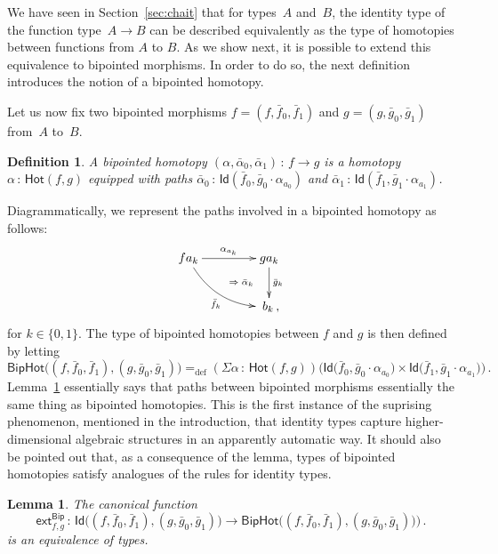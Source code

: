 \documentclass[10pt,a4paper,oneside,reqno]{amsart}
\numberwithin{equation}{section}
\theoremstyle{mythm}
\newtheorem{lemma}[theorem]{Lemma}
\theoremstyle{mydef}
\newtheorem{definition}[theorem]{Definition}
\theoremstyle{myrmk}
\newcommand{\defeq}{=_{\mathrm{def}}}
\newcommand{\co}{\,{:}\,}
\newcommand{\ct}{\cdot}
\newcommand{\Hot}{\mathsf{Hot}}
\newcommand{\ext}{\mathsf{ext}}
\newcommand{\Id}{\mathsf{Id}}
\newcommand{\Bip}{\mathsf{Bip}}
\newcommand{\BipHot}{\mathsf{BipHot}}
\begin{document}
We have seen in Section~\ref{sec:chait} that for types~$A$ and~$B$, the identity type of the function
 type~$A \to B$ can be described equivalently as the type of homotopies between functions from $A$ to $B$. As
we show next, it is possible to extend this equivalence to bipointed morphisms. In order to do so, the next definition  introduces the notion of a bipointed homotopy. 


\medskip

Let us now fix two bipointed morphisms $f = (f, \bar{f}_0, \bar{f}_1)$ and $g = (g, \bar{g}_0, \bar{g}_1)$ from~$A$
to~$B$.


\begin{definition} \label{thm:biphomotopy} A \emph{bipointed homotopy} 
$(\alpha, \bar{\alpha}_0, \bar{\alpha}_1) \co f \to  g$
is a homotopy~$\alpha \co  \Hot(f, g)$ equipped with paths
$\bar{\alpha}_0 \co \Id(  \bar{f}_0 ,  \bar{g}_0 \ct \alpha_{a_0}  )$ and $\bar{\alpha}_1 \co \Id(
\bar{f}_1 , \bar{g}_1 \ct  \alpha_{a_1})$. 
\end{definition}

Diagrammatically, we represent the paths  involved in a bipointed homotopy as follows:
\[
\xymatrix@C=1.5cm{
f a_k  \ar[r]^{\alpha_{a_k}}  \ar@/_1pc/[dr]_{\bar{f}_k}  
\ar@{}[dr]|{\qquad \Rightarrow \; \bar{\alpha}_k}  & g a_k \ar[d]^{\bar{g}_k}  \\ 
 & \; b_k  \, ,}
  \] 
  for $k \in \{ 0, 1 \}$. The type of bipointed homotopies between $f$ and $g$ is then defined by letting
\[
 \BipHot  \big( (f,\bar{f}_0, \bar{f}_1), (g, \bar{g}_0, \bar{g}_1) \big)   \defeq   
 (\Sigma \alpha \co \Hot( f , g)) \big( 
  \Id\big( \bar{f}_0 ,   \bar{g}_0 \ct \alpha_{a_0}   \big) \times 
  \Id \big( \bar{f}_1,    \bar{g}_1 \ct \alpha_{a_1}  \big) \big) \, .
\]
Lemma~\ref{BoolHomSpace} essentially says that paths between bipointed morphisms
essentially the same thing as bipointed homotopies. This  is
the first instance of the suprising phenomenon, mentioned in the introduction,
that identity types capture higher-dimensional algebraic structures in an apparently
automatic way. It should also be pointed out that, as a consequence of the lemma, types of bipointed homotopies satisfy
analogues of the rules for identity types.


\begin{lemma} \label{BoolHomSpace} 
The canonical  function 
\[
\ext^{\Bip}_{f,g} \co \Id \big( (f, \bar{f}_0, \bar{f}_1), (g, \bar{g}_0, \bar{g}_1) \big) \to 
\BipHot\big( (f, \bar{f}_0, \bar{f}_1), (g, \bar{g}_0, \bar{g}_1) ) \big) \, .
\]
is an equivalence of types.
\end{lemma}
\end{document}
